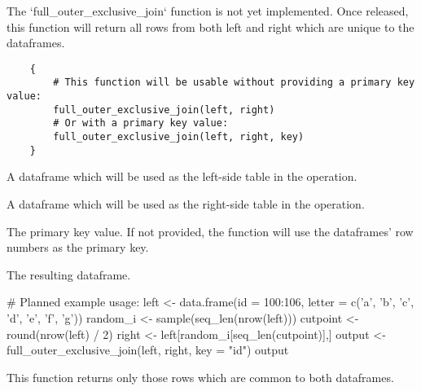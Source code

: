 \documentclass[a4paper]{book}
\begin{document}
%
\begin{Description}\relax
The `full\_outer\_exclusive\_join` function is not yet implemented.
Once released, this function will return all rows from both left and right which are unique to the dataframes.
\end{Description}
%
\begin{Usage}
\begin{verbatim}
    {
        # This function will be usable without providing a primary key value:
        full_outer_exclusive_join(left, right)
        # Or with a primary key value:
        full_outer_exclusive_join(left, right, key)
    }
\end{verbatim}
\end{Usage}
%
\begin{Arguments}
\begin{ldescription}
\item[\code{left}] A dataframe which will be used as the left-side table in the operation.
\item[\code{right}] A dataframe which will be used as the right-side table in the operation.
\item[\code{key}] The primary key value. If not provided, the function will use the dataframes' row numbers as the primary key.
\end{ldescription}
\end{Arguments}
%
\begin{Value}
\begin{ldescription}
\item[\code{rtn}] The resulting dataframe.
\end{ldescription}
\end{Value}
%
\begin{Examples}
\begin{ExampleCode}
    # Planned example usage:
    left <- data.frame(id = 100:106, letter = c('a', 'b', 'c', 'd', 'e', 'f', 'g'))
    random_i <- sample(seq_len(nrow(left)))
    cutpoint <- round(nrow(left) / 2)
    right <- left[random_i[seq_len(cutpoint)],]
    output <- full_outer_exclusive_join(left, right, key = "id")
    output
\end{ExampleCode}
\end{Examples}
%
\begin{Description}\relax
This function returns only those rows which are common to both dataframes.
\end{Description}
\end{document}
